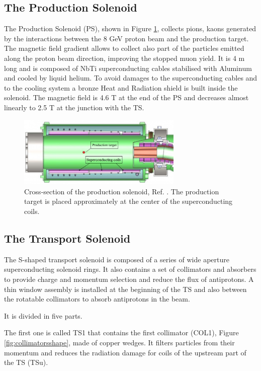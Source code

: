\subsection{The Production Solenoid}
The Production Solenoid (PS), shown in Figure \ref{fig:PS}, collects pions, 
kaons generated by the interactions between the 8 GeV proton beam and the production target. 
The magnetic field gradient allows to collect also part of the particles 
emitted along the proton beam direction, improving the stopped muon yield.
It is 4 m long and is composed of NbTi superconducting cables stabilised with
Aluminum and cooled by liquid helium. To avoid damages to the superconducting cables and
to the cooling system a bronze Heat and Radiation shield is built inside the solenoid.
The magnetic field is 4.6 T at the end of the PS and decreases almost linearly to 2.5 T at the
junction with the TS.
\begin{figure}[!h]
    \centering
    \includegraphics[width =0.7\textwidth]{figures/png/800px-Production_solenoid.png}
    \caption[The cross-section of the production solenoid.]{Cross-section of the production solenoid, Ref. \cite{6376120}.
    The production target is placed approximately at the center of the superconducting coils.}
    \label{fig:PS}
    \end{figure}
\subsection{The Transport Solenoid}
The S-shaped transport solenoid is composed of a series of wide aperture superconducting
solenoid rings. It also contains a set of collimators and absorbers to provide charge and 
momentum selection and reduce the flux of antiprotons.
A thin window assembly is installed at the 
beginning of the TS and also between the rotatable collimators to absorb antiprotons in 
the beam. 

It is divided in five parts. 

The first one is called TS1 that contains the first collimator (COL1), 
Figure \ref{fig:collimatorsshape}, made of copper wedges. 
It filters particles from their momentum and reduces the radiation damage for coils of the 
upstream part of the TS (TSu). 

